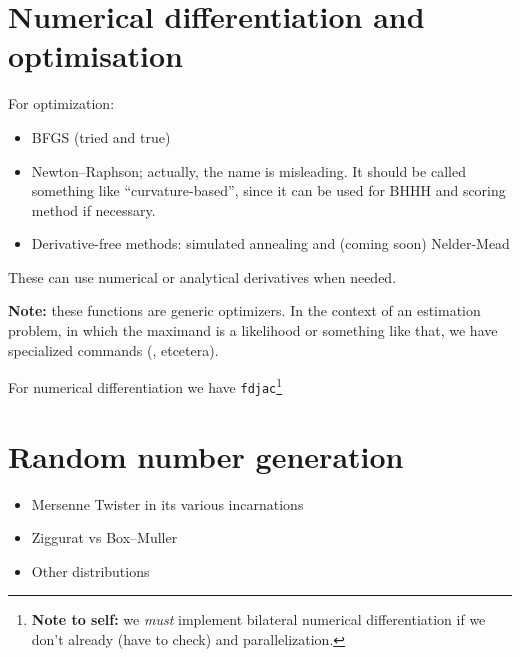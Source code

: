 \section{Numerical differentiation and optimisation}

For optimization:
\begin{itemize}
\item BFGS (tried and true)
\item Newton--Raphson; actually, the name is misleading. It should be
  called something like ``curvature-based'', since it can be used for
  BHHH and scoring method if necessary.
\item Derivative-free methods: simulated annealing and (coming soon)
  Nelder-Mead
\end{itemize}

These can use numerical or analytical derivatives when needed.

\textbf{Note:} these functions are generic optimizers. In the context
of an estimation problem, in which the maximand is a likelihood or
something like that, we have specialized commands (,
 etcetera).

For numerical differentiation we have
\texttt{fdjac}\footnote{\textbf{Note to self:} we \emph{must}
  implement bilateral numerical differentiation if we don't already
  (have to check) and parallelization.}


\section{Random number generation}

\begin{itemize}
\item Mersenne Twister in its various incarnations
\item Ziggurat vs Box--Muller
\item Other distributions
\end{itemize}

